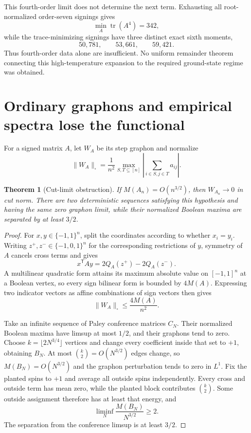 \documentclass[11pt]{article}
\newtheorem{theorem}{Theorem}
\newcommand{\eps}{\{-1,1\}}
\DeclareMathOperator{\tr}{tr}
\begin{document}
This fourth-order limit does not determine the next term.  Exhausting all
root-normalized order-seven signings gives
\[
 \min_A\tr(A^4)=342,
\]
while the trace-minimizing signings have three distinct exact sixth moments,
\[
 50{,}781,\qquad 53{,}661,\qquad 59{,}421.
\]
Thus fourth-order data alone are insufficient.  No uniform remainder theorem
connecting this high-temperature expansion to the required ground-state
regime was obtained.

\section{Ordinary graphons and empirical spectra lose the functional}

For a signed matrix \(A\), let \(W_A\) be its step graphon and normalize
\[
 \|W_A\|_\square=\frac1{n^2}
 \max_{S,T\subseteq[n]}
 \left|\sum_{i\in S,j\in T}a_{ij}\right|.
\]

\begin{theorem}[Cut-limit obstruction]
\label{thm:graphon}
If \(M(A_n)=O(n^{3/2})\), then \(W_{A_n}\to0\) in cut norm.  There are two
deterministic sequences satisfying this hypothesis and having the same zero
graphon limit, while their normalized Boolean maxima are separated by at
least \(3/2\).
\end{theorem}

\begin{proof}
For \(x,y\in\eps^n\), split the coordinates according to whether \(x_i=y_i\).
Writing \(z^+,z^-\in\{-1,0,1\}^n\) for the corresponding restrictions of
\(y\), symmetry of \(A\) cancels cross terms and gives
\[
 x^{\mathsf T}Ay=2Q_A(z^+)-2Q_A(z^-).
\]
A multilinear quadratic form attains its maximum absolute value on
\([-1,1]^n\) at a Boolean vertex, so every sign bilinear form is bounded by
\(4M(A)\).  Expressing two indicator vectors as affine combinations of sign
vectors then gives
\[
 \|W_A\|_\square\le\frac{4M(A)}{n^2}.
\]

Take an infinite sequence of Paley conference matrices \(C_N\).  Their
normalized Boolean maxima have limsup at most \(1/2\), and their graphons tend
to zero.  Choose \(k=\lfloor2N^{3/4}\rfloor\) vertices and change every
coefficient inside that set to \(+1\), obtaining \(B_N\).  At most
\(\binom k2=O(N^{3/2})\) edges change, so \(M(B_N)=O(N^{3/2})\) and the
graphon perturbation tends to zero in \(L^1\).  Fix the planted spins to
\(+1\) and average all outside spins independently.  Every cross and outside
term has mean zero, while the planted block contributes \(\binom k2\).
Some outside assignment therefore has at least that energy, and
\[
 \liminf_N\frac{M(B_N)}{N^{3/2}}\ge2.
\]
The separation from the conference limsup is at least \(3/2\).
\end{proof}
\end{document}

